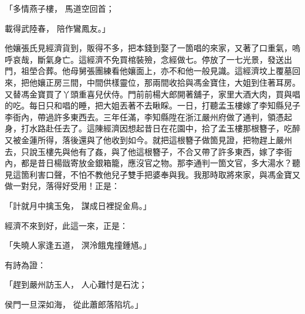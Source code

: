 \begin{showcontents}{}
「多情燕子樓，  馬道空回首；

載得武陸春，  陪作鸞鳳友。」

他孃張氏見經濟貨到，販得不多，把本錢到娶了一箇唱的來家，又著了口重氣，嗚呼哀哉，斷氣身亡。這經濟不免買棺裝殮，念經做七。停放了一七光景，發送出門，祖塋合葬。他母舅張團練看他孃面上，亦不和他一般見識。這經濟坟上覆墓回來，把他孃正房三間，中間供樣靈位，那兩間收拾與馮金寶住，大姐到住著耳房。又替馮金寶買了丫頭重喜兒伏侍。門前前楊大郎開著舖子，家里大酒大肉，買與唱的吃。每日只和唱的睡，把大姐丟著不去瞅睬。一日，打聽孟玉樓嫁了李知縣兒子李衙內，帶過許多東西去。三年任滿，李知縣陞在浙江嚴州府做了通判，領憑起身，打水路赴任去了。這陳經濟因想起昔日在花園中，拾了孟玉樓那根簪子，吃醉又被金蓮所得，落後還與了他收到如今。就把這根簪子做箇見證，把物趕上嚴州去，只說玉樓先與他有了姦，與了他這根簪子，不合又帶了許多東西，嫁了李衙內，都是昔日楊戩寄放金銀箱籠，應沒官之物。那李通判一箇文官，多大湯水？聽見這箇利害口聲，不怕不教他兒子雙手把婆奉與我。我那時取將來家，與馮金寶又做一對兒，落得好受用！正是：

「計就月中擒玉兔，  謀成日裡捉金鳥。」

經濟不來到好，此這一來，正是：

「失曉人家逢五道，  溟泠餓鬼撞鍾馗。」

有詩為證：

「趕到嚴州訪玉人，  人心難忖是石沈；

侯門一旦深如海，  從此蕭郎落陷坑。」


\end{showcontents}
